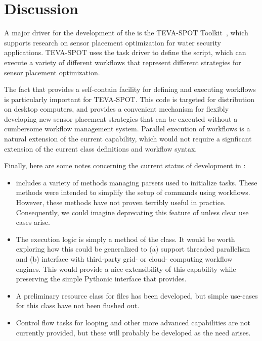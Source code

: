 
\section{Discussion}

\label{sec:disc}

A major driver for the development of the \pwsp is the TEVA-SPOT
Toolkit~\cite{SPOT}, which supports research on sensor placement
optimization for water security applications.  TEVA-SPOT uses the
\pwsp task driver to define the  script, which can execute
a variety of different workflows that represent different strategies
for sensor placement optimization.

The fact that \pwsp provides a self-contain facility for defining
and executing workflows is particularly important for TEVA-SPOT.
This code is targeted for distribution on desktop computers, and
\pwsp provides a convenient mechanism for flexibly developing new
sensor placement strategies that can be executed without a cumbersome
workflow management system.  Parallel execution of \pwsp workflows
is a natural extension of the current capability, which would not
require a signficant extension of the current class definitions and
workflow syntax.

Finally, here are some notes concerning the current status of development in \pw:
\begin{itemize}

\item \pwsp includes a variety of methods managing parsers used to
initialize tasks.  These methods were intended to simplify the setup
of commands using workflows.  However, these methods have not proven
terribly useful in practice.  Consequently, we could imagine
deprecating this feature of \pwsp unless clear use cases arise.

\item The \pwsp execution logic is simply a method of the 
class.  It would be worth exploring how this could be generalized
to (a) support threaded parallelism and (b) interface with third-party
grid- or cloud- computing workflow engines.  This would provide a
nice extensibility of this capability while preserving the simple
Pythonic interface that \pwsp provides.

\item A preliminary resource class for files has been developed,
but simple use-cases for this class have not been flushed out.

\item Control flow tasks for looping and other more advanced
capabilities are not currently provided, but these will probably
be developed as the need arises.

\end{itemize}
